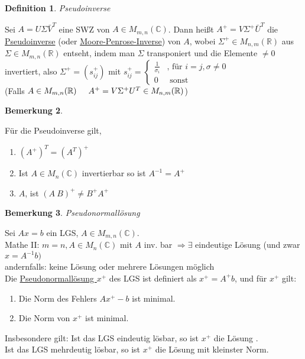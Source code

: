 \documentclass[a4paper,11pt]{article}
\newtheorem{definition}{Definition}[section]
\newtheorem{bem}[definition]{Bemerkung}
\newcommand{\hsp}{\hspace{5mm}}
\begin{document}
\begin{definition}
	Pseudoinverse
\end{definition}
Sei $A=U\Sigma\bar V^T$ eine SWZ von $A\in M_{m,n}(\mathbb{C})$. Dann heißt $A^+=V\Sigma^+\bar U^T$ die \underline{Pseudoinverse} (oder \underline{Moore-Penrose-Inverse}) von $A$, wobei $\Sigma^+\in M_{n,m}(\mathbb{R})$ aus $\Sigma\in M_{m,n}(\mathbb{R})$ entseht, indem man $\Sigma$ transponiert und die Elemente $\neq0$ invertiert, also $\Sigma^+=(s_{ij}^+)$ mit $s_{ij}^+=\left\{\begin{array}{ll}\frac{1}{\sigma_i} & \text{, für }i=j,\sigma\neq0 \\ 0 & \text{ sonst}\end{array}\right.$  \\
(Falls $A\in M_{m,n}(\mathbb{R})\hsp A^+=V\Sigma^+U^T\in M_{n,m}(\mathbb{R})$)

\begin{bem}
\end{bem}
Für die Pseudoinverse gilt,
\begin{enumerate}[label=\alph*)]
	\item $(A^+)^T=(A^T)^+$
	\item Ist $A\in M_n(\mathbb{C})$ invertierbar so ist $A^{-1}=A^+$ 
	\item $A$, ist $(A\:B)^+\neq B^+A^+$
\end{enumerate}

\newpage

\begin{bem}
	Pseudonormallösung
\end{bem}
Sei $Ax=b$ ein LGS, $A\in M_{m,n}(\mathbb{C})$. \\
Mathe II: $m=n, A\in M_n(\mathbb{C})$ mit $A$ inv. bar $\Rightarrow\exists$ eindeutige Lösung (und zwar $x=A^{-1}b)$ \\
andernfalls: keine Lösung oder mehrere Lösungen möglich \\
Die \underline{Pseudonormallösung } $x^+$ des LGS ist definiert als $x^+=A^+b$, und für $x^+$ gilt:
\begin{enumerate}[label=\arabic*)]
	\item Die Norm des Fehlers $Ax^+-b$ ist minimal.
	\item Die Norm von $x^+$ ist minimal.
\end{enumerate}
Insbesondere gilt: Ist das LGS eindeutig lösbar, so ist $x^+$ die Lösung .\\
Ist das LGS mehrdeutig lösbar, so ist $x^+$ die Lösung mit kleinster Norm.
\end{document}
